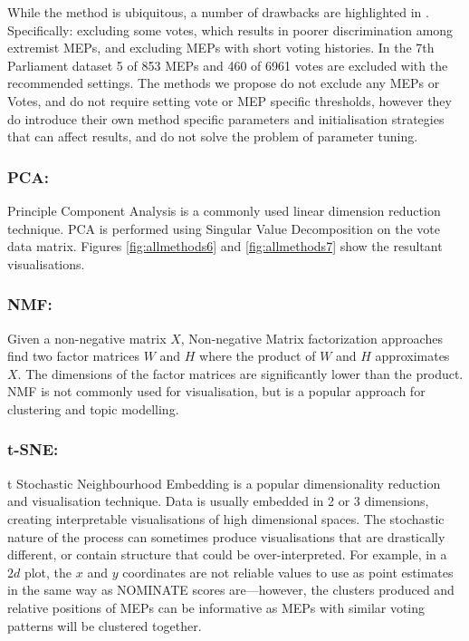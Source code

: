 \documentclass{llncs}
\begin{document}
While the method is ubiquitous, a number of drawbacks are highlighted in \cite{clinton2003statistical}. Specifically: excluding some votes, which results in poorer discrimination among extremist MEPs, and excluding MEPs with short voting histories. In the 7th Parliament dataset 5 of 853 MEPs and 460 of 6961 votes are excluded with the recommended settings. The methods we propose do not exclude any MEPs or Votes, and do not require setting vote or MEP specific thresholds, however they do introduce their own method specific parameters and initialisation strategies that can affect results, and do not solve the problem of parameter tuning.

\subsubsection{PCA:}
Principle Component Analysis\cite{Fodor02DRSurvey} is a commonly used linear dimension reduction technique. PCA is performed using Singular Value Decomposition on the vote data matrix. Figures \ref{fig:allmethods6} and \ref{fig:allmethods7} show the resultant visualisations.

\subsubsection{NMF:}
Given a non-negative matrix $X$, Non-negative Matrix factorization\cite{nmf1} approaches find two factor matrices $W$ and $H$ where the product of $W$ and $H$ approximates $X$. The dimensions of the factor matrices are significantly lower than the product. NMF is not commonly used for visualisation, but is a popular approach for clustering\cite{nmf} and topic modelling.

\subsubsection{t-SNE:}
t Stochastic Neighbourhood Embedding is a popular dimensionality reduction and visualisation technique. Data is usually embedded in 2 or 3 dimensions, creating interpretable visualisations of high dimensional spaces. The stochastic nature of the process can sometimes produce visualisations that are drastically different, or contain structure that could be over-interpreted. For example, in a $2d$ plot, the $x$ and $y$ coordinates are not reliable values to use as point estimates in the same way as NOMINATE scores are---however, the clusters produced and relative positions of MEPs can be informative as MEPs with similar voting patterns will be clustered together. 
\end{document}
